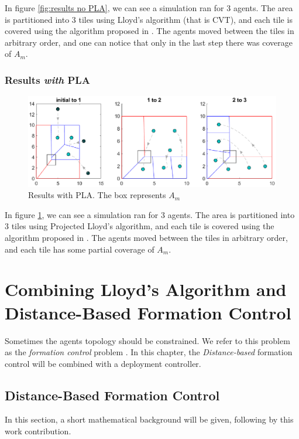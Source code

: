 \documentclass{iacas}
\begin{document}
In figure \ref{fig:results no PLA}, we can see a simulation ran for 3 agents. The area is partitioned into 3 tiles using Lloyd's algorithm (that is CVT), and each tile is covered using the algorithm proposed in \cite{Cortes2004}. The agents moved between the tiles in arbitrary order, and one can notice that only in the last step there was coverage of $A_m$.

\subsubsection{Results \emph{with} PLA}
\begin{figure}[H]
\includegraphics[scale=0.8]{figures/proposed-sol/results/sim2-3agents-3partitions-PLA.eps}
\caption{Results with PLA. The box represents $A_m$}
\label{fig:results PLA}
\end{figure}

In figure \ref{fig:results PLA}, we can see a simulation ran for 3 agents. The area is partitioned into 3 tiles using Projected Lloyd's algorithm, and each tile is covered using the algorithm proposed in \cite{Cortes2004}. The agents moved between the tiles in arbitrary order, and each tile has some partial coverage of $A_m$.

\section{Combining Lloyd's Algorithm and Distance-Based Formation Control}
Sometimes the agents topology should be constrained. We refer to this problem as the \emph{formation control} problem \cite{Oh2015}. In this chapter, the \emph{Distance-based} formation control will be combined with a deployment controller.

\subsection{Distance-Based Formation Control}
In this section, a short mathematical background will be given, following by this work contribution.
\end{document}
